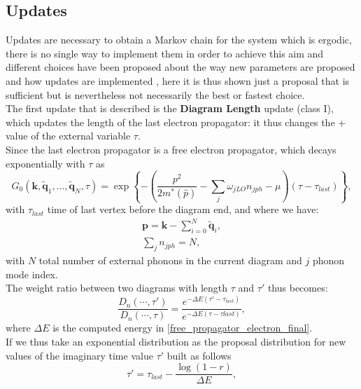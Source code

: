 \subsection{Updates}
Updates are necessary to obtain a Markov chain for the system which is ergodic, there is no single way to implement them in order to 
achieve this aim and different choices have been proposed about the way new parameters are proposed and how updates are implemented 
\cite{mishchenko2000diagrammatic}\cite{hahn2018diagrammatic}, here it is thus shown just a proposal that is sufficient but is nevertheless not 
necessarily the best or fastest choice.\\
The first update that is described is the \textbf{Diagram Length} update (class I), which updates the length of the last electron propagator: it thus changes the +
value of the external variable $\tau$.\\
Since the last electron propagator is a free electron propagator, which decays exponentially with $\tau$ as
\begin{equation}
    G_0(\mathbf{k},\tilde{\mathbf{q}}_1,...,\tilde{\mathbf{q}}_N,\tau)=\exp{ \left\{-\left(\frac{p^2}{2m^*(\hat{p})}-\sum_{j}\omega_{jLO}n_{jph}-\mu \right)(\tau-\tau_{last})\right\}},
    \label{free_propagator_electron_final}
\end{equation}
with $\tau_{last}$ time of last vertex before the diagram end, and where we have:
\begin{equation}
\begin{split}
    \mathbf{p}=\mathbf{k}-\sum_{i=0}^N\tilde{\mathbf{q}}_i,\\
    \sum_j n_{jph}=N,
\end{split}
\end{equation}
with $N$ total number of external phonons in the current diagram and $j$ phonon mode index.\\
The weight ratio between two diagrams with length $\tau$ and $\tau'$ thus becomes:
\begin{equation}
    \frac{D_n(\cdots,\tau')}{D_n(\cdots,\tau)}=\frac{e^{-\Delta E (\tau'-\tau_{last})}}{e^{-\Delta E (\tau-\tau{last})}},
    \label{weights_diagram_length}
\end{equation}
where $\Delta E$ is the computed energy in \ref{free_propagator_electron_final}.\\
If we thus take an exponential distribution as the proposal distribution for new values of the imaginary time value $\tau'$ built as follows
\begin{equation}
    \tau'=\tau_{last}-\frac{\log{\left(1-r\right)}}{\Delta E},
\end{equation}
